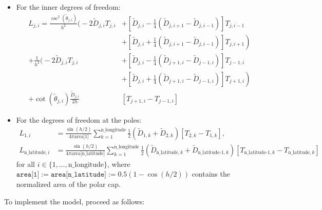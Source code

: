 \documentclass[10pt]{scrartcl}
\begin{document}
\begin{itemize}
\item For the inner degrees of freedom:
\begin{equation} \label{innerDoF}
\begin{split}
L_{j,i} = \frac{\csc^2(\tilde{\theta}_{j,i})}{h^2}\Big(-2\tilde{D}_{j,i}T_{j,i}&+\left[\tilde{D}_{j,i}-\frac{1}{4}(\tilde{D}_{j,i+1}-\tilde{D}_{j,i-1})\right]T_{j,i-1}  \\
& \left. + \left[\tilde{D}_{j,i}+\frac{1}{4}(\tilde{D}_{j,i+1}-\tilde{D}_{j,i-1})\right]T_{j,i+1}\right) \\
+ \frac{1}{h^2}\Big(-2\tilde{D}_{j,i}T_{j,i}&+\left[\tilde{D}_{j,i}-\frac{1}{4}(\tilde{D}_{j+1,i}-\tilde{D}_{j-1,i})\right]T_{j-1,i}  \\
& \left. +\left[\tilde{D}_{j,i}+\frac{1}{4}(\tilde{D}_{j+1,i}-\tilde{D}_{j-1,i})\right]T_{j+1,i}\right) \\
 + \cot(\tilde{\theta}_{j,i})\frac{\tilde{D}_{j,i}}{2h}&\left[T_{j+1,i}-T_{j-1,i}\right]
\end{split}
\end{equation}

\item For the degrees of freedom at the poles:
\begin{align}
L_{1,i} &= \frac{\sin(h/2)}{4 \pi \text{area[1]}}\sum^{\text{n\_longitude}}_{k=1}\frac{1}{2}\left(\tilde{D}_{1,k}+\tilde{D}_{2,k}\right)\left[T_{2,k}-T_{1,k}\right], \\
L_{\text{n\_latitude},i} &= \frac{\sin(h/2)}{4 \pi \text{area[n\_latitude]}}\sum^{\text{n\_longitude}}_{k=1}\frac{1}{2}\left(\tilde{D}_{\text{n\_latitude},k}+\tilde{D}_{\text{n\_latitude-1},k}\right)\left[T_{\text{n\_latitude-1},k}-T_{\text{n\_latitude},k}\right]
\label{polesDoF}
\end{align}
for all $i \in \{1,\dots,\text{n\_longitude}\}$, where $\texttt{area[1]} := \texttt{area[n\_latitude]} := 0.5\left(1-\cos\left(h/2\right)\right)$ contains the normalized area of the polar cap.

\end{itemize}
\newpage
To implement the model, proceed as follows:
\end{document}
